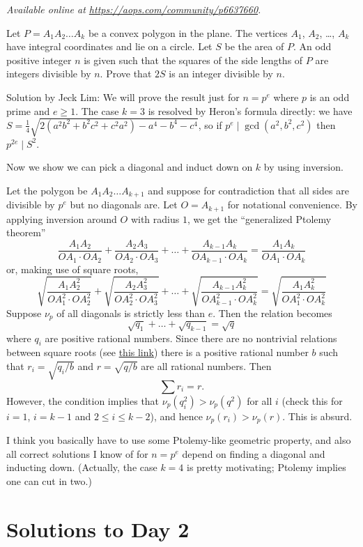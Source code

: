 \textsl{Available online at \url{https://aops.com/community/p6637660}.}
\begin{mdframed}[style=mdpurplebox,frametitle={Problem statement}]
Let $P=A_1A_2\dots A_k$ be a convex polygon in the plane.
The vertices $A_1$, $A_2$, \dots, $A_k$ have integral coordinates
and lie on a circle. Let $S$ be the area of $P$.
An odd positive integer $n$ is given such that
the squares of the side lengths of $P$ are integers divisible by $n$.
Prove that $2S$ is an integer divisible by $n$.
\end{mdframed}
Solution by Jeck Lim:
We will prove the result just for $n = p^e$
where $p$ is an odd prime and $e \ge 1$.
The case $k=3$ is resolved by Heron's formula directly:
we have $S = \frac14\sqrt{2(a^2b^2 + b^2c^2 + c^2a^2) - a^4-b^4-c^4}$,
so if $p^e \mid \gcd(a^2,b^2,c^2)$ then $p^{2e} \mid S^2$.

Now we show we can pick a diagonal and induct down on $k$ by using inversion.

Let the polygon be $A_1 A_2 \dots A_{k+1}$
and suppose for contradiction that all sides are divisible by $p^e$
but no diagonals are.
Let $O = A_{k+1}$ for notational convenience.
By applying inversion around $O$ with radius $1$,
we get the ``generalized Ptolemy theorem''
\[
  \frac{A_1A_2}{OA_1 \cdot OA_2}
  + \frac{A_2A_3}{OA_2 \cdot OA_3}
  + \dots
  + \frac{A_{k-1} A_k}{OA_{k-1} \cdot OA_k}
  = \frac{A_1 A_k}{OA_1 \cdot OA_k}
\]
or, making use of square roots,
\[
  \sqrt{\frac{A_1A_2^2}{OA_1^2 \cdot OA_2^2}}
  + \sqrt{\frac{A_2A_3^2}{OA_2^2 \cdot OA_3^2}}
  + \dots
  + \sqrt{\frac{A_{k-1} A_k^2}{OA_{k-1}^2 \cdot OA_k^2}}
  = \sqrt{\frac{A_1 A_k^2}{OA_1^2 \cdot OA_k^2}}
\]
Suppose $\nu_p$ of all diagonals is strictly less than $e$.
Then the relation becomes
\[ \sqrt{q_1} + \dots + \sqrt{q_{k-1}} = \sqrt q \]
where $q_i$ are positive rational numbers.
Since there are no nontrivial relations between square roots
(see \href{https://qchu.wordpress.com/2009/07/02/square-roots-have-no-unexpected-linear-relationships/}{this link})
there is a positive rational number $b$
such that $r_i = \sqrt{q_i/b}$ and $r = \sqrt{q/b}$
are all rational numbers.
Then
\[ \sum r_i = r. \]
However, the condition implies that $\nu_p(q_i^2) > \nu_p(q^2)$ for all $i$
(check this for $i=1$, $i=k-1$ and $2 \le i \le k-2$),
and hence $\nu_p(r_i) > \nu_p(r)$.
This is absurd.

\begin{remark*}
  I think you basically have to use some Ptolemy-like geometric property,
  and also all correct solutions I know of for $n = p^e$
  depend on finding a diagonal and inducting down.
  (Actually, the case $k=4$ is pretty motivating;
  Ptolemy implies one can cut in two.)
\end{remark*}
\pagebreak

\section{Solutions to Day 2}